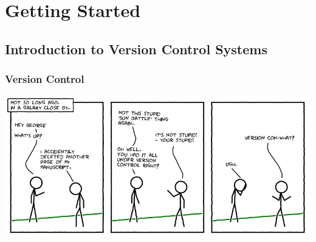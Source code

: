 \section{Getting Started}

\subsection{Introduction to Version Control Systems}

\begin{frame}
  \frametitle{Version Control}

  \begin{center}
    \includegraphics[width=1.0\linewidth]{figures/git-comics}
  \end{center}

\end{frame}

